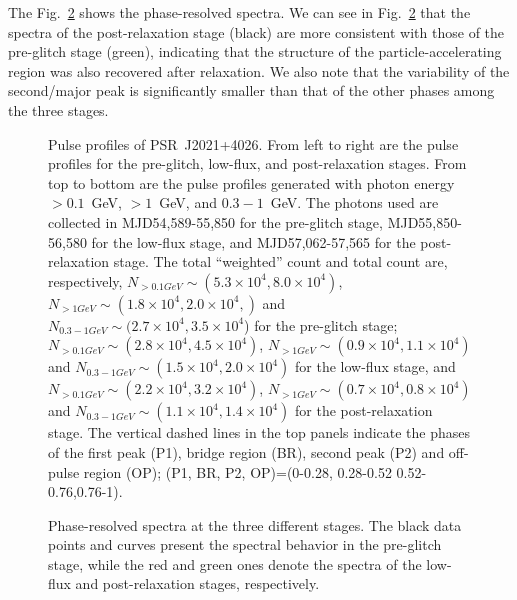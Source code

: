 \documentclass[12pt,preprint]{aastex}
\begin{document}
The Fig.~\ref{phase} shows the phase-resolved spectra. We can see in Fig.~\ref{phase} that
the spectra of the post-relaxation stage (black) are more consistent with those of the pre-glitch stage (green), indicating that  the structure of the particle-accelerating region was also recovered after relaxation. We also note
that the variability of the second/major peak is significantly smaller than that of the other phases among the three stages.

\begin{figure}
  \centering
\caption{Pulse profiles of PSR~J2021+4026. From left to right are the  pulse
  profiles for the pre-glitch, low-flux, and post-relaxation stages.
  From top to bottom are the pulse profiles generated with photon energy $>0.1$~GeV,  $>1$~GeV, and $0.3-1$~GeV.   The photons used  are collected in  MJD54,589-55,850 for the pre-glitch stage,  MJD55,850-56,580
    for the low-flux stage, and MJD57,062-57,565 for the post-relaxation stage.
  The total ``weighted'' count and total count are, respectively, 
  $N_{>0.1GeV}\sim (5.3\times 10^4, 8.0\times 10^4)$, $N_{>1GeV}\sim (1.8\times 10^4, 2.0\times 10^4, )$ and $N_{0.3-1GeV}\sim(2.7\times 10^4, 3.5\times 10^4$) for the pre-glitch stage;
  $N_{>0.1GeV}\sim (2.8\times 10^4, 4.5\times 10^4)$, $N_{>1GeV}\sim (0.9\times 10^4, 1.1\times 10^4)$
  and $N_{0.3-1GeV}\sim (1.5\times 10^4 , 2.0\times 10^4)$ for the  low-flux stage, and
  $N_{>0.1GeV}\sim (2.2\times 10^4, 3.2\times 10^4)$,   $N_{>1GeV}\sim (0.7\times 10^4,
  0.8\times 10^4)$ and $N_{0.3-1GeV}\sim (1.1\times 10^4, 1.4\times 10^4)$
  for the post-relaxation stage. The vertical dashed lines in the top panels indicate the phases of the first peak (P1), bridge region (BR),
  second peak (P2) and off-pulse region (OP); (P1, BR, P2, OP)=(0-0.28, 0.28-0.52 0.52-0.76,0.76-1). }
  \label{pulse}
 \end{figure}

\begin{figure}
  \centering
  \caption{Phase-resolved spectra at the three different stages. The black data points and curves present the spectral behavior in the pre-glitch stage, while the red and green ones denote the spectra of the low-flux and post-relaxation stages, respectively.}
  \label{phase}
\end{figure}
\end{document}
